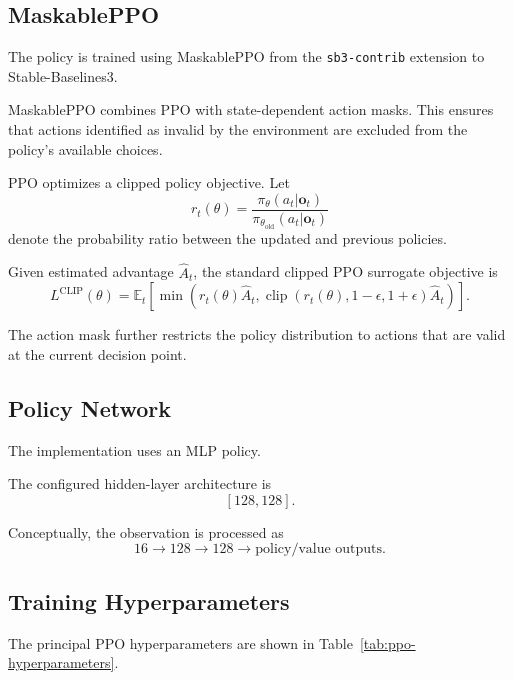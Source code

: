 \documentclass[11pt]{article}
\begin{document}
\subsection{MaskablePPO}

The policy is trained using MaskablePPO from the \texttt{sb3-contrib}
extension to Stable-Baselines3.

MaskablePPO combines PPO with state-dependent action masks. This ensures that
actions identified as invalid by the environment are excluded from the
policy's available choices.

PPO optimizes a clipped policy objective. Let
\[
r_t(\theta)
=
\frac{
\pi_\theta(a_t|\mathbf{o}_t)
}{
\pi_{\theta_{\mathrm{old}}}(a_t|\mathbf{o}_t)
}
\]
denote the probability ratio between the updated and previous policies.

Given estimated advantage $\widehat{A}_t$, the standard clipped PPO surrogate
objective is
\[
L^{\mathrm{CLIP}}(\theta)
=
\mathbb{E}_t
\left[
\min
\left(
r_t(\theta)\widehat{A}_t,
\operatorname{clip}
\left(
r_t(\theta),
1-\epsilon,
1+\epsilon
\right)
\widehat{A}_t
\right)
\right].
\]

The action mask further restricts the policy distribution to actions that
are valid at the current decision point.


\subsection{Policy Network}

The implementation uses an MLP policy.

The configured hidden-layer architecture is
\[
[128,128].
\]

Conceptually, the observation is processed as
\[
16
\rightarrow
128
\rightarrow
128
\rightarrow
\text{policy/value outputs}.
\]


\subsection{Training Hyperparameters}

The principal PPO hyperparameters are shown in
Table~\ref{tab:ppo-hyperparameters}.
\end{document}
